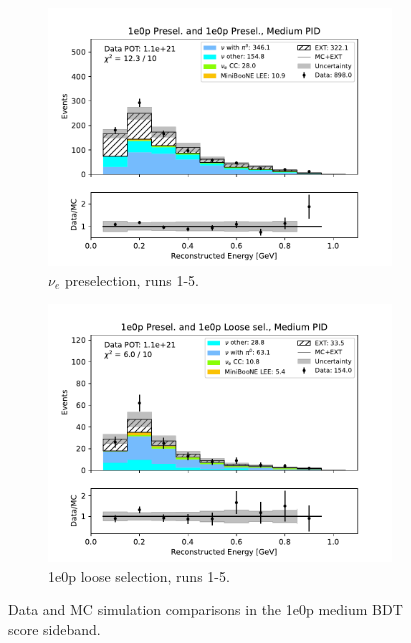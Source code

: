 \begin{figure}[H]
\begin{subfigure}{0.5\linewidth}
        \includegraphics[width=\linewidth]{technote/Sidebands/Figures/NearSideband/near_sideband_reco_e_run1234b4c4d5_ZP_ZP_MEDIUM_PID.pdf}
        \caption{$\nu_e$ preselection, runs 1-5.}
    \end{subfigure}%
    \begin{subfigure}{0.5\linewidth}
        \includegraphics[width=\linewidth]{technote/Sidebands/Figures/NearSideband/near_sideband_reco_e_run1234b4c4d5_ZP_ZPLOOSESEL_MEDIUM_PID.pdf}
        \caption{1e0p loose selection, runs 1-5.}
    \end{subfigure}
    \caption{Data and MC simulation comparisons in the 1e0p medium BDT score sideband.}
\end{figure}

